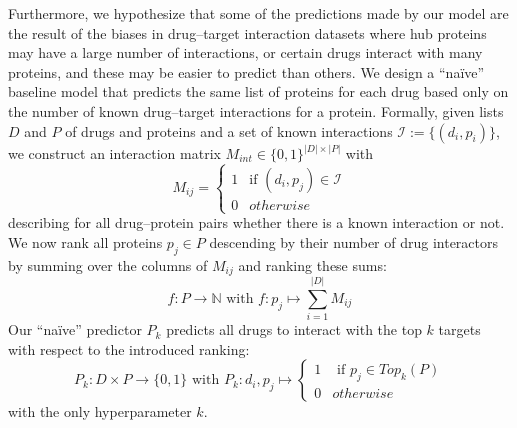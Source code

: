 \documentclass{bioinfo}
\begin{document}


Furthermore, we hypothesize that some of the predictions made by our
model are the result of the biases in drug--target interaction
datasets where hub proteins may have a large number of interactions,
or certain drugs interact with many proteins, and these may be easier
to predict than others. We design a ``na\"ive'' baseline model that
predicts the same list of proteins for each drug based only on the
number of known drug--target interactions for a protein. Formally,
given lists $D$ and $P$ of drugs and proteins and a set of known
interactions $\mathcal{I} := \{(d_i, p_i) \}$, we construct an
interaction matrix $M_{int}\in\{0,1\}^{|D|\times|P|}$ with
\begin{equation*}
	M_{ij} = \begin{cases}
		1 & \text{if } (d_i, p_j)\in \mathcal{I}\\
		0 & otherwise
	\end{cases}
\end{equation*}
describing for all drug--protein pairs whether there is a known
interaction or not. We now rank all proteins $p_j\in P$ descending by
their number of drug interactors by summing over the columns of
$M_{ij}$ and ranking these sums:
\begin{equation*}
	f: P \rightarrow \mathbb{N} \text{ with } f:p_j \mapsto \sum_{i=1}^{|D|}M_{ij}
\end{equation*}
Our ``na\"ive'' predictor $P_k$ predicts all drugs to interact with
the top $k$ targets with respect to the introduced ranking:
\begin{equation*}
	P_k: D\times P \rightarrow \{0,1\} \text{ with } P_k: d_i, p_j \mapsto \begin{cases}
		1 & \text{ if }p_j \in Top_{k}(P)\\
		0 & otherwise
	\end{cases}
\end{equation*}
with the only hyperparameter $k$.
\end{document}
